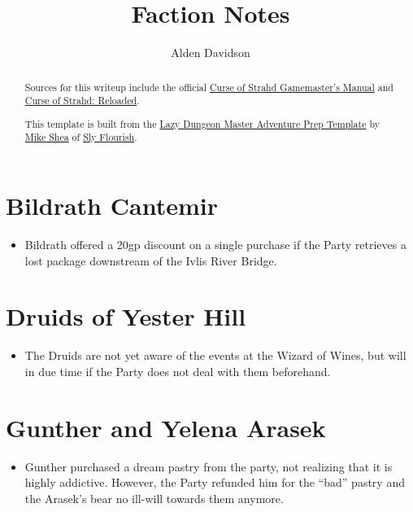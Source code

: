 \documentclass[a4paper,11pt]{article}
\title{Faction Notes}
\author{Alden Davidson}
\begin{document}
\maketitle
\tableofcontents

\begin{abstract}
  Sources for this writeup include the official
  \href{https://5e.tools/adventure.html#cos}{Curse of Strahd Gamemaster's Manual} and
  \href{https://www.reddit.com/r/CurseofStrahd/comments/9bpzbh/curse_of_strahd_reloaded_compilation_thread/}{Curse of Strahd: Reloaded}.
  
  This template is built from the
  \href{https://slyflourish.com/rotldm_template.html}{Lazy Dungeon Master Adventure Prep Template} by
  \href{https://slyflourish.com/about_mike_shea.html}{Mike Shea} of \href{https://slyflourish.com/}{Sly Flourish}.
\end{abstract}

\pagebreak
\section{Bildrath Cantemir}
\begin{itemize}
  \item Bildrath offered a 20gp discount on a single purchase if the Party retrieves a lost package downstream of
  the Ivlis River Bridge.
\end{itemize}

\section{Druids of Yester Hill}
\begin{itemize}
  \item The Druids are not yet aware of the events at the Wizard of Wines, but will in due time if the Party does 
  not deal with them beforehand.
\end{itemize}

\section{Gunther and Yelena Arasek}
\begin{itemize}
  \item Gunther purchased a dream pastry from the party, not realizing that it is highly addictive. However, the 
  Party refunded him for the ``bad'' pastry and the Arasek's bear no ill-will towards them anymore.
\end{itemize}
\end{document}
